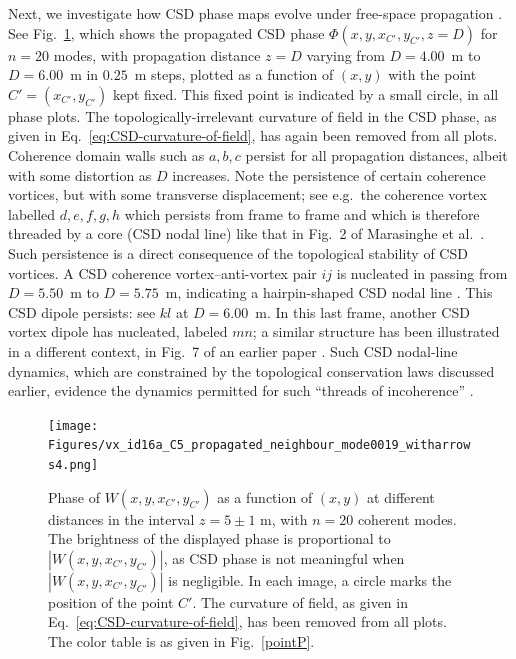 \documentclass[%
 reprint,
 amsmath,amssymb,
 aps,
]{revtex4-1}
\begin{document}
Next, we investigate how CSD phase maps evolve under free-space propagation \cite{TopologicalReactionsCohVortices,Marasinghe2010,Marasinghe2011}. See Fig.~\ref{neighbour}, which shows the propagated CSD phase $\Phi(x,y,x_{C'},y_{C'},z=D)$ for $n=20$ modes, with propagation distance $z=D$ varying from $D=4.00$~m to $D=6.00$~m in $0.25$~m steps, plotted as a function of $(x,y)$ with the point $C'=(x_{C'},y_{C'})$ kept fixed. This fixed point is indicated by a small circle, in all phase plots. The topologically-irrelevant curvature of field in the CSD phase, as given in Eq.~\ref{eq:CSD-curvature-of-field}, has again been removed from all plots. Coherence domain walls such as $a,b,c$ persist for all propagation distances, albeit with some distortion as $D$ increases.  Note the persistence of certain coherence vortices, but with some transverse displacement; see e.g.~the coherence vortex labelled $d,e,f,g,h$ which persists from frame to frame and which is therefore threaded by a core (CSD nodal line) like that in Fig.~2 of Marasinghe et al.~\cite{Marasinghe2010}. Such persistence is a direct consequence of the topological stability of CSD vortices.  A CSD coherence vortex--anti-vortex pair $ij$ is nucleated in passing from $D=5.50$~m to $D=5.75$~m, indicating a hairpin-shaped CSD nodal line \cite{Marasinghe2010,Marasinghe2011}.   This CSD dipole persists: see $kl$ at $D=6.00$~m.  In this last frame, another CSD vortex dipole has nucleated, labeled $mn$; a similar structure has been illustrated in a different context, in Fig.~7 of an earlier paper \cite{Marasinghe2010}.  Such CSD nodal-line dynamics, which are constrained by the topological conservation laws discussed earlier, evidence the dynamics permitted for such ``threads of incoherence'' \cite{TopologicalReactionsCohVortices, Marasinghe2011}.

\begin{figure}
\texttt{[image: Figures/vx\_id16a\_C5\_propagated\_neighbour\_mode0019\_witharrows4.png]}
\caption{Phase of $W(x,y,x_{C'},y_{C'})$ as a function of $(x,y)$ at different distances in the interval $z=5\pm 1$ m, with $n=20$ coherent modes. The brightness of the displayed phase is proportional to $|W(x,y,x_{C'},y_{C'})|$, as CSD phase is not meaningful when $|W(x,y,x_{C'},y_{C'})|$ is negligible. In each image, a circle marks the position of the point $C'$. The curvature of field, as given in Eq.~\ref{eq:CSD-curvature-of-field}, has been removed from all plots.  The color table is as given in Fig.~\ref{pointP}.}
\label{neighbour}%
\end{figure}
\end{document}
